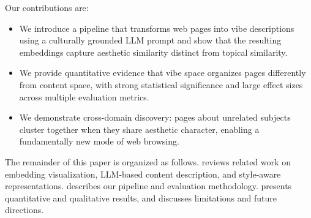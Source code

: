 Our contributions are:
\begin{itemize}[leftmargin=*,itemsep=0pt,topsep=0pt]
    \item We introduce a pipeline that transforms web pages into vibe descriptions using a culturally grounded LLM prompt and show that the resulting embeddings capture aesthetic similarity distinct from topical similarity.
    \item We provide quantitative evidence that vibe space organizes pages differently from content space, with strong statistical significance and large effect sizes across multiple evaluation metrics.
    \item We demonstrate cross-domain discovery: pages about unrelated subjects cluster together when they share aesthetic character, enabling a fundamentally new mode of web browsing.
\end{itemize}

The remainder of this paper is organized as follows.
 reviews related work on embedding visualization, LLM-based content description, and style-aware representations.
 describes our pipeline and evaluation methodology.
 presents quantitative and qualitative results, and  discusses limitations and future directions.
